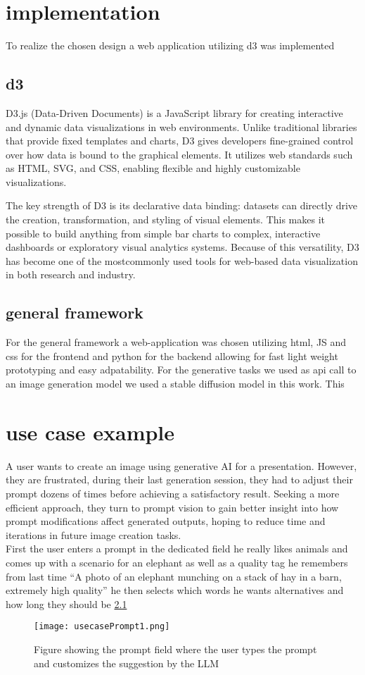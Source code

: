 \documentclass[
  a4paper,  %
  twoside,  %
  bibliography=totoc,
  headsepline,
  cleardoublepage=empty,
  parskip=half,
  draft=false
]{scrbook}
\begin{document}
\chapter{implementation}
To realize the chosen design a web application utilizing d3 was implemented
\section{d3}
D3.js (Data-Driven Documents) is a JavaScript library for creating interactive and dynamic data visualizations in web environments. Unlike traditional libraries that provide fixed templates and charts, D3 gives developers fine-grained control over how data is bound to the graphical elements. It utilizes web standards such as HTML, SVG, and CSS, enabling flexible and highly customizable visualizations.

The key strength of D3 is its declarative data binding: datasets can directly drive the creation, transformation, and styling of visual elements. This makes it possible to build anything from simple bar charts to complex, interactive dashboards or exploratory visual analytics systems. Because of this versatility, D3 has become one of the mostcommonly used tools for web-based data visualization in both research and industry.

\section{general framework}
For the general framework a web-application was chosen utilizing html, JS and css for the frontend and python for the backend allowing for fast light weight prototyping and easy adpatability. For the generative tasks we used as api call to an image generation model we used a stable diffusion model \cite{stableDiffusion} in this work.
This 
\chapter{use case example}
A user wants to create an image using generative AI for a presentation. However, they are frustrated, during their last generation session, they had to adjust their prompt dozens of times before achieving a satisfactory result. Seeking a more efficient approach, they turn to prompt vision to gain better insight into how prompt modifications affect generated outputs, hoping to reduce time and iterations in future image creation tasks.\\
First the user enters a prompt in the dedicated field he really likes animals and comes up with a scenario for an elephant as well as a quality tag he remembers from last time \enquote{A photo of an elephant munching on a stack of hay in a barn, extremely high quality} he then selects which words he wants alternatives and how long they should be \cref{fig:usecasePrompt1}
\begin{figure}[H]
	\centering
	\texttt{[image: usecasePrompt1.png]}
	\caption{Figure showing the prompt field where the user types the prompt and customizes the suggestion by the LLM}
	\label{fig:usecasePrompt1}
\end{figure}
\end{document}
